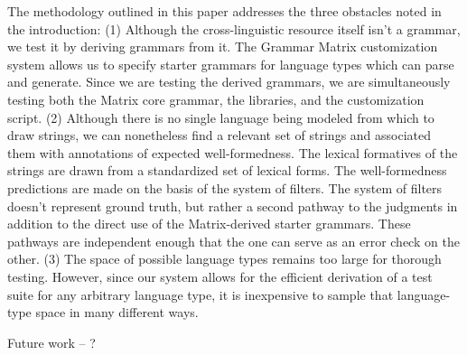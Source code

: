 \documentclass[11pt]{article}
\begin{document}
The methodology outlined in this paper addresses the three obstacles
noted in the introduction: (1) Although the cross-linguistic resource
itself isn't a grammar, we test it by deriving grammars from it.  The
Grammar Matrix customization system allows us to specify starter
grammars for language types which can parse and generate.  Since we
are testing the derived grammars, we are simultaneously testing both
the Matrix core grammar, the libraries, and the customization script.
(2) Although there is no single language being modeled from which to
draw strings, we can nonetheless find a relevant set of strings and
associated them with annotations of expected well-formedness.  The
lexical formatives of the strings are drawn from a standardized set
of lexical forms.  The well-formedness predictions are made on the basis
of the system of filters.  The system of filters doesn't represent
ground truth, but rather a second pathway to the judgments in 
addition to the direct use of the Matrix-derived starter grammars.
These pathways are independent enough that the one can serve as an
error check on the other. (3) The space of possible language types
remains too large for thorough testing.  However, since our system allows
for the efficient derivation of a test suite for any arbitrary
language type, it is inexpensive to sample that language-type space in
many different ways.

Future work -- ?










\end{document}
